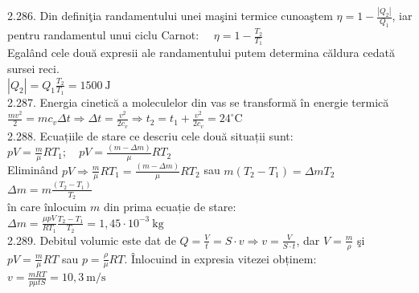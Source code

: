 2.286. Din definiţia randamentului unei maşini termice cunoaştem $\eta=1-\frac{\left|Q_{2}\right|}{Q_{1}}$, iar pentru randamentul unui ciclu Carnot: $\quad \eta=1-\frac{T_{2}}{T_{1}}$\\ Egalând cele două expresii ale randamentului putem determina căldura cedată sursei reci.\\ $\left|Q_{2}\right|=Q_{1} \frac{T_{2}}{T_{1}}=1500 \mathrm{~J}$\\

2.287. Energia cinetică a moleculelor din vas se transformă în energie termică\\ $\frac{m v^{2}}{2}=m c_{v} \Delta t \Rightarrow \Delta t=\frac{v^{2}}{2 c_{v}} \Rightarrow t_{2}=t_{1}+\frac{v^{2}}{2 c_{v}}=24^{\circ} \mathrm{C}$\\

2.288. Ecuațiile de stare ce descriu cele două situații sunt:\\ $p V=\frac{m}{\mu} R T_{1} ; \quad p V=\frac{(m-\Delta m)}{\mu} R T_{2}$\\ Eliminând $p V \Rightarrow \frac{m}{\mu} R T_{1}=\frac{(m-\Delta m)}{\mu} R T_{2}$ sau $m\left(T_{2}-T_{1}\right)=\Delta m T_{2}$\\ $\Delta m=m \frac{\left(T_{2}-T_{1}\right)}{T_{2}}$\\ în care înlocuim $m$ din prima ecuație de stare:\\ $\Delta m=\frac{\mu p V}{R T_{1}} \frac{T_{2}-T_{1}}{T_{2}}=1,45 \cdot 10^{-3} \mathrm{~kg}$\\

2.289. Debitul volumic este dat de $Q=\frac{V}{t}=S \cdot v \Rightarrow v=\frac{V}{S \cdot t}$, dar $V=\frac{m}{\rho}$ şi $p V=\frac{m}{\mu} R T$ sau $p=\frac{\rho}{\mu} R T$. Înlocuind in expresia vitezei obținem:\\ $v=\frac{m R T}{p \mu t S}=10,3 \mathrm{~m} / \mathrm{s}$\\

